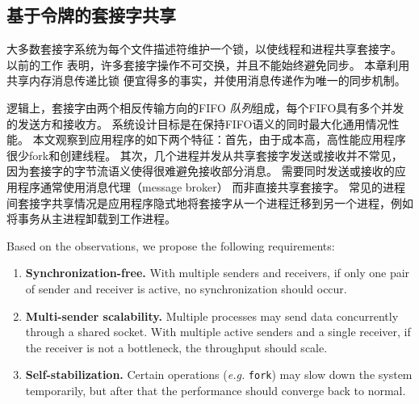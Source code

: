 \subsection{基于令牌的套接字共享}
\label{socksdirect:subsec:fork}


大多数套接字系统为每个文件描述符维护一个锁，以使线程和进程共享套接字。
以前的工作 \cite {boyd2010analysis,clements2015scalable} 表明，许多套接字操作不可交换，并且不能始终避免同步。
本章利用共享内存消息传递比锁 \cite {roghanchi2017ffwd} 便宜得多的事实，并使用消息传递作为唯一的同步机制。


逻辑上，套接字由两个相反传输方向的FIFO \emph {队列}组成，每个FIFO具有多个并发的发送方和接收方。
系统设计目标是在保持FIFO语义的同时最大化通用情况性能。
本文观察到应用程序的如下两个特征：首先，由于成本高，高性能应用程序很少fork和创建线程。
其次，几个进程并发从共享套接字发送或接收并不常见，因为套接字的字节流语义使得很难避免接收部分消息。
需要同时发送或接收的应用程序通常使用消息代理（message broker） \cite {hintjens2013zeromq,rabbitmq2017rabbitmq,kreps2011kafka} 而非直接共享套接字。
常见的进程间套接字共享情况是应用程序隐式地将套接字从一个进程迁移到另一个进程，例如将事务从主进程卸载到工作进程。






\iffalse
Based on the observations, we propose the following requirements:

\begin{enumerate}
 \item \textbf{Synchronization-free.} With multiple senders and receivers, if only one pair of sender and receiver is active, no synchronization should occur.
 \item \textbf{Multi-sender scalability.} Multiple processes may send data concurrently through a shared socket. With multiple active senders and a single receiver, if the receiver is not a bottleneck, the throughput should scale.
 \item \textbf{Self-stabilization.} Certain operations (\textit{e.g.} \texttt{fork}) may slow down the system temporarily, but after that the performance should converge back to normal.
\end{enumerate}


